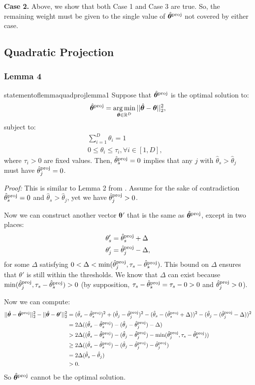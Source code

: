 \documentclass{article} %
\newcommand{\bmthproj}{\hat{\bm{\theta}}^{\textnormal{proj}}}
\newcommand{\thproj}{\hat{\theta}^{\textnormal{proj}}}
\begin{document}
\textbf{Case 2.}
Above, we show that both Case 1 and Case 3 are true. So, the remaining weight must be given to the single value of $\bmthproj$ not covered by either case.

\subsection{Quadratic Projection}

\subsubsection{Lemma 4}

\begin{restatable}{statementoflemma}{quadprojlemma1}
\label{quad_lemma1}
Suppose that $\bmthproj$ is the optimal solution to:
\[
\bmthproj = \argmin_{\bm{\theta}\in\mathbb{R}^D} ||\hat{\bm{\theta}}-\bm{\theta}||_2^2,
\]
subject to:
\begin{align*}
\sum_{i=1}^D \theta_i = 1&\\
0 \leq \theta_i \leq \tau_i, \forall i \in [1,D],
\end{align*}
where $\tau_i>0$ are fixed values. Then, $\thproj_s=0$ implies that any $j$ with $\hat{\theta}_s > \hat{\theta}_j$ must have $\thproj_j=0$.
\end{restatable}

\textit{Proof:} This is similar to Lemma 2 from \citet{shalev2006efficient}. Assume for the sake of contradiction $\thproj_s = 0$ and $\hat{\theta}_s > \hat{\theta}_j$, yet we have $\thproj_j > 0$.

Now we can construct another vector $\bm{\theta}'$ that is the same as $\bmthproj$, except in two places:
\begin{align*}
\theta'_s &= \thproj_s + \Delta\\
\theta'_j &= \thproj_j - \Delta,
\end{align*}
for some $\Delta$ satisfying $0 < \Delta < \min(\thproj_j, \tau_s-\thproj_s)$. This bound on $\Delta$ ensures that $\theta'$ is still within the thresholds. We know that $\Delta$ can exist because $\min(\thproj_j, \tau_s-\thproj_s) > 0$ (by supposition, $\tau_s-\thproj_s = \tau_s - 0 > 0$ and $\thproj_j>0$).

Now we can compute:
\begin{align*}
||\hat{\bm{\theta}}-\bmthproj||^2_2 - ||\hat{\bm{\theta}}-\bm{\theta}'||^2_2 &= (\hat{\theta}_s - \thproj_s)^2 + (\hat{\theta}_j - \thproj_j)^2 - (\hat{\theta}_s - (\thproj_s + \Delta))^2 - (\hat{\theta}_j - (\thproj_j - \Delta))^2\\
&= 2\Delta((\hat{\theta}_s - \thproj_s) - (\hat{\theta}_j - \thproj_j) - \Delta)\\
&> 2\Delta((\hat{\theta}_s - \thproj_s) - (\hat{\theta}_j - \thproj_j) - \min(\thproj_j, \tau_s - \thproj_s))\\
&\geq 2\Delta((\hat{\theta}_s - \thproj_s) - (\hat{\theta}_j - \thproj_j) - \thproj_j)\\
&= 2\Delta(\hat{\theta}_s - \hat{\theta}_j)\\
&> 0.
\end{align*}
So $\bmthproj$ cannot be the optimal solution.
\end{document}
